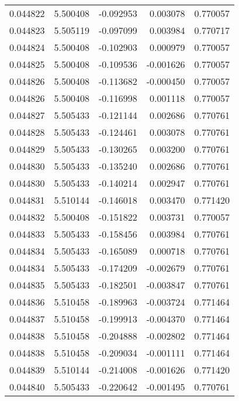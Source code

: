 \begin{tabular}{lrrrr}
0.044822    &  5.500408 & -0.092953 &  0.003078 &             0.770057 \\
0.044823    &  5.505119 & -0.097099 &  0.003984 &             0.770717 \\
0.044824    &  5.500408 & -0.102903 &  0.000979 &             0.770057 \\
0.044825    &  5.500408 & -0.109536 & -0.001626 &             0.770057 \\
0.044826    &  5.500408 & -0.113682 & -0.000450 &             0.770057 \\
0.044826    &  5.500408 & -0.116998 &  0.001118 &             0.770057 \\
0.044827    &  5.505433 & -0.121144 &  0.002686 &             0.770761 \\
0.044828    &  5.505433 & -0.124461 &  0.003078 &             0.770761 \\
0.044829    &  5.505433 & -0.130265 &  0.003200 &             0.770761 \\
0.044830    &  5.505433 & -0.135240 &  0.002686 &             0.770761 \\
0.044830    &  5.505433 & -0.140214 &  0.002947 &             0.770761 \\
0.044831    &  5.510144 & -0.146018 &  0.003470 &             0.771420 \\
0.044832    &  5.500408 & -0.151822 &  0.003731 &             0.770057 \\
0.044833    &  5.505433 & -0.158456 &  0.003984 &             0.770761 \\
0.044834    &  5.505433 & -0.165089 &  0.000718 &             0.770761 \\
0.044834    &  5.505433 & -0.174209 & -0.002679 &             0.770761 \\
0.044835    &  5.505433 & -0.182501 & -0.003847 &             0.770761 \\
0.044836    &  5.510458 & -0.189963 & -0.003724 &             0.771464 \\
0.044837    &  5.510458 & -0.199913 & -0.004370 &             0.771464 \\
0.044838    &  5.510458 & -0.204888 & -0.002802 &             0.771464 \\
0.044838    &  5.510458 & -0.209034 & -0.001111 &             0.771464 \\
0.044839    &  5.510144 & -0.214008 & -0.001626 &             0.771420 \\
0.044840    &  5.505433 & -0.220642 & -0.001495 &             0.770761 \\

\end{tabular}
